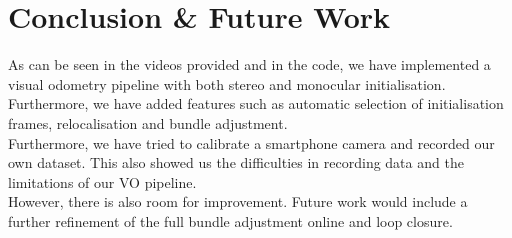 \section{Conclusion \& Future Work}

As can be seen in the videos provided and in the code, we have implemented a visual odometry pipeline with both stereo and monocular initialisation. Furthermore, we have added features such as automatic selection of initialisation frames, relocalisation and bundle adjustment. \\
Furthermore, we have tried to calibrate a smartphone camera and recorded our own dataset. This also showed us the difficulties in recording data and the limitations of our VO pipeline. \\
However, there is also room for improvement. Future work would include a further refinement of the full bundle adjustment online and loop closure. 